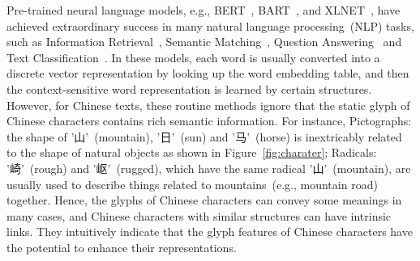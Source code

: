 \begin{CJK}{UTF8}{gbsn}
Pre-trained neural language models, e.g., BERT~\cite{devlin-etal-2019-bert}, BART~\cite{lewis-etal-2020-bart}, and XLNET~\cite{xlnet}, have achieved extraordinary success in many natural language processing~(NLP) tasks, such as Information Retrieval~\cite{ir_bert}, Semantic Matching~\cite{semantic_bert,reimers-gurevych-2019-sentence_bert}, Question Answering~\cite{wang-etal-2017-questiona, questiona2} and Text Classification~\cite{text_classification}. In these models, each word is usually converted into a discrete vector representation by looking up the word embedding table, and then the context-sensitive word representation is learned by certain structures. However, for Chinese texts, these routine methods ignore that the static glyph of Chinese characters contains rich semantic information. For instance, Pictographs: the shape of '山'~(mountain), '日'~(sun) and '马'~(horse) is inextricably related to the shape of natural objects as shown in Figure~\ref{fig:charater}; Radicals: '崎'~(rough) and '岖'~(rugged), which have the same radical '山'~(mountain), are usually used to describe things related to mountains~(e.g., mountain road) together. Hence, the glyphs of Chinese characters can convey some meanings in many cases, and Chinese characters with similar structures can have intrinsic links. They intuitively indicate that the glyph features of Chinese characters have the potential to enhance their representations.
\end{CJK}




